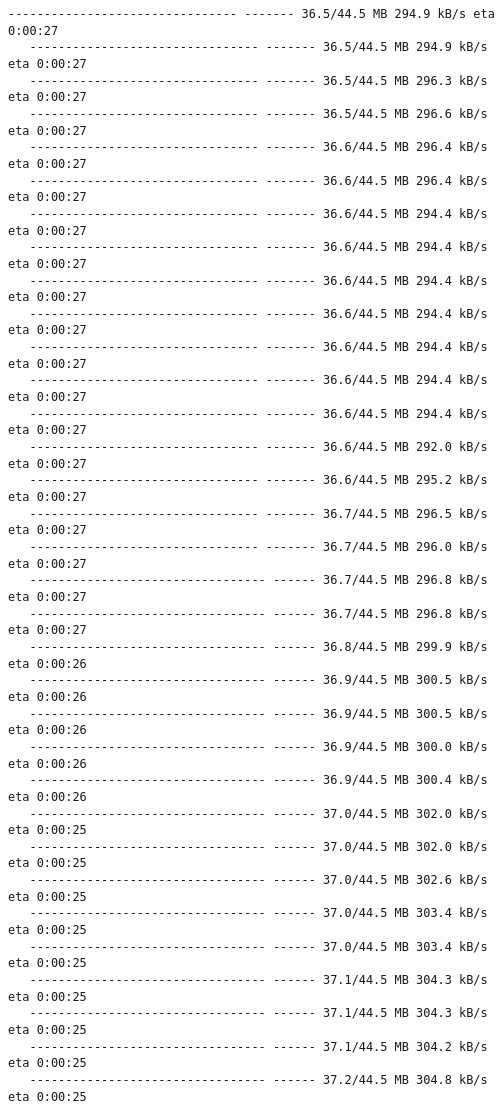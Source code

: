 \documentclass[11pt]{article}
\begin{document}
\begin{Verbatim}[commandchars=\\\{\}]
   -------------------------------- ------- 36.5/44.5 MB 294.9 kB/s eta 0:00:27
   -------------------------------- ------- 36.5/44.5 MB 294.9 kB/s eta 0:00:27
   -------------------------------- ------- 36.5/44.5 MB 296.3 kB/s eta 0:00:27
   -------------------------------- ------- 36.5/44.5 MB 296.6 kB/s eta 0:00:27
   -------------------------------- ------- 36.6/44.5 MB 296.4 kB/s eta 0:00:27
   -------------------------------- ------- 36.6/44.5 MB 296.4 kB/s eta 0:00:27
   -------------------------------- ------- 36.6/44.5 MB 294.4 kB/s eta 0:00:27
   -------------------------------- ------- 36.6/44.5 MB 294.4 kB/s eta 0:00:27
   -------------------------------- ------- 36.6/44.5 MB 294.4 kB/s eta 0:00:27
   -------------------------------- ------- 36.6/44.5 MB 294.4 kB/s eta 0:00:27
   -------------------------------- ------- 36.6/44.5 MB 294.4 kB/s eta 0:00:27
   -------------------------------- ------- 36.6/44.5 MB 294.4 kB/s eta 0:00:27
   -------------------------------- ------- 36.6/44.5 MB 294.4 kB/s eta 0:00:27
   -------------------------------- ------- 36.6/44.5 MB 292.0 kB/s eta 0:00:27
   -------------------------------- ------- 36.6/44.5 MB 295.2 kB/s eta 0:00:27
   -------------------------------- ------- 36.7/44.5 MB 296.5 kB/s eta 0:00:27
   -------------------------------- ------- 36.7/44.5 MB 296.0 kB/s eta 0:00:27
   --------------------------------- ------ 36.7/44.5 MB 296.8 kB/s eta 0:00:27
   --------------------------------- ------ 36.7/44.5 MB 296.8 kB/s eta 0:00:27
   --------------------------------- ------ 36.8/44.5 MB 299.9 kB/s eta 0:00:26
   --------------------------------- ------ 36.9/44.5 MB 300.5 kB/s eta 0:00:26
   --------------------------------- ------ 36.9/44.5 MB 300.5 kB/s eta 0:00:26
   --------------------------------- ------ 36.9/44.5 MB 300.0 kB/s eta 0:00:26
   --------------------------------- ------ 36.9/44.5 MB 300.4 kB/s eta 0:00:26
   --------------------------------- ------ 37.0/44.5 MB 302.0 kB/s eta 0:00:25
   --------------------------------- ------ 37.0/44.5 MB 302.0 kB/s eta 0:00:25
   --------------------------------- ------ 37.0/44.5 MB 302.6 kB/s eta 0:00:25
   --------------------------------- ------ 37.0/44.5 MB 303.4 kB/s eta 0:00:25
   --------------------------------- ------ 37.0/44.5 MB 303.4 kB/s eta 0:00:25
   --------------------------------- ------ 37.1/44.5 MB 304.3 kB/s eta 0:00:25
   --------------------------------- ------ 37.1/44.5 MB 304.3 kB/s eta 0:00:25
   --------------------------------- ------ 37.1/44.5 MB 304.2 kB/s eta 0:00:25
   --------------------------------- ------ 37.2/44.5 MB 304.8 kB/s eta 0:00:25

\end{Verbatim}
\end{document}
